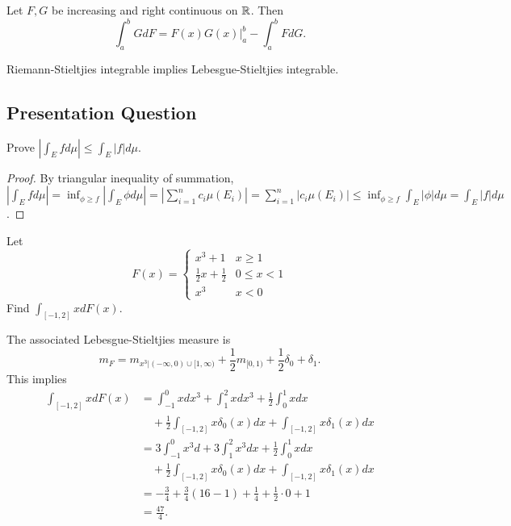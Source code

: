 \documentclass[class=book, crop=false]{standalone}
\begin{document}
        \begin{theorem}
            Let $F, G$ be increasing and right continuous on $\mathbb{R}$. Then
            \begin{equation*}
                \int^b_a G dF = F(x) G(x) \bigg|^b_a - \int^b_a F dG.
            \end{equation*}
        \end{theorem}
        
        \begin{remark}
            Riemann-Stieltjies integrable implies Lebesgue-Stieltjies integrable.
        \end{remark}
        
        \subsection{Presentation Question}
        \begin{question}
            Prove $|\int_E f d\mu |\leq \int_E |f| d\mu$.
        \end{question}
        \begin{proof}
            By triangular inequality of summation,
            $|\int_E f d\mu| = \inf_{\phi \geq f} |\int_E \phi d\mu| = |\sum^{n}_{i = 1} c_i \mu(E_i)| = \sum^{n}_{i = 1} |c_i \mu(E_i)| \leq \inf_{\phi \geq f} \int_E |\phi| d\mu = \int_E |f| d\mu$.
        \end{proof}

        \begin{question}
            Let
            \begin{equation*}
                F(x) = \begin{cases}
                    x^3 + 1 & x \geq 1 \\
                    \frac{1}{2} x + \frac{1}{2} & 0 \leq x < 1 \\
                    x^3 & x < 0
                \end{cases}
            \end{equation*}
            Find $\int_{[-1, 2]} x dF(x)$.
        \end{question}
        The associated Lebesgue-Stieltjies measure is
        \begin{equation*}
            m_F = m_{x^3|(-\infty, 0) \cup [1, \infty)} + \frac{1}{2} m_{[0, 1)} + \frac{1}{2} \delta_{0} + \delta_1.
        \end{equation*}
        This implies
        \begin{align*}
            \int_{[-1, 2]} x dF(x) &= \int^{0}_{-1} x dx^3 + \int^{2}_{1} x dx^3 + \frac{1}{2} \int^1_0 x dx \\
            &\quad + \frac{1}{2} \int_{[-1, 2]} x \delta_0(x) dx + \int_{[-1, 2]} x \delta_1(x) dx \\
            &= 3\int^{0}_{-1} x^3 d + 3\int^{2}_{1} x^3 dx + \frac{1}{2} \int^1_0 x dx \\
            &\quad + \frac{1}{2} \int_{[-1, 2]} x \delta_0(x) dx + \int_{[-1, 2]} x \delta_1(x) dx \\
            &= -\frac{3}{4} + \frac{3}{4} (16 - 1) + \frac{1}{4} + \frac{1}{2} \cdot 0 + 1 \\
            &= \frac{47}{4}.
        \end{align*}
\end{document}
